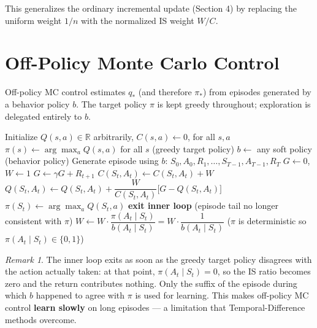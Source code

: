 \documentclass[11pt,a4paper]{article}
\theoremstyle{definition}
\theoremstyle{plain}
\theoremstyle{remark}
\newtheorem*{remark}{Remark}
\begin{document}
This generalizes the ordinary incremental update (Section 4) by replacing the uniform weight $1/n$ with the normalized IS weight $W / C$.

\section{Off-Policy Monte Carlo Control}

Off-policy MC control estimates $q_*$ (and therefore $\pi_*$) from episodes generated by a behavior policy $b$. The target policy $\pi$ is kept greedy throughout; exploration is delegated entirely to $b$.

\begin{algorithm}
\caption{Off-Policy MC Control, estimating $\pi \approx \pi_*$}
\begin{algorithmic}
\STATE Initialize $Q(s, a) \in \mathbb{R}$ arbitrarily, $C(s, a) \leftarrow 0$, for all $s, a$
\STATE $\pi(s) \leftarrow \arg\max_a Q(s, a)$ for all $s$ (greedy target policy)
\LOOP
    \STATE $b \leftarrow$ any soft policy (behavior policy)
    \STATE Generate episode using $b$: $S_0, A_0, R_1, \ldots, S_{T-1}, A_{T-1}, R_T$
    \STATE $G \leftarrow 0$, $W \leftarrow 1$
        \STATE $G \leftarrow \gamma G + R_{t+1}$
        \STATE $C(S_t, A_t) \leftarrow C(S_t, A_t) + W$
        \STATE $Q(S_t, A_t) \leftarrow Q(S_t, A_t) + \dfrac{W}{C(S_t, A_t)}\bigl[G - Q(S_t, A_t)\bigr]$
        \STATE $\pi(S_t) \leftarrow \arg\max_a Q(S_t, a)$
            \STATE \textbf{exit inner loop} (episode tail no longer consistent with $\pi$)
        \ENDIF
        \STATE $W \leftarrow W \cdot \dfrac{\pi(A_t \mid S_t)}{b(A_t \mid S_t)} = W \cdot \dfrac{1}{b(A_t \mid S_t)}$ \hfill($\pi$ is deterministic so $\pi(A_t \mid S_t) \in \{0,1\}$)
    \ENDFOR
\ENDLOOP
\end{algorithmic}
\end{algorithm}

\begin{remark}
The inner loop exits as soon as the greedy target policy disagrees with the action actually taken: at that point, $\pi(A_t \mid S_t) = 0$, so the IS ratio becomes zero and the return contributes nothing. Only the suffix of the episode during which $b$ happened to agree with $\pi$ is used for learning. This makes off-policy MC control \textbf{learn slowly} on long episodes — a limitation that Temporal-Difference methods overcome.
\end{remark}
\end{document}
